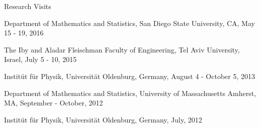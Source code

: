 \documentclass[10pt]{article} %
\newenvironment{innerlist}[1][\enskip\textbullet]%
        {\begin{compactitem}[#1]}{\end{compactitem}}
\begin{document}
\begin{section}{Research Visits}
\begin{innerlist}
\item Department of Mathematics and Statistics, San Diego State University, CA, May 15 - 19, 2016
\item The Iby and Aladar Fleischman Faculty of Engineering, Tel Aviv University, Israel, July 5 - 10, 2015
\item Instit\"ut f\"ur Physik, Universit\"at Oldenburg, Germany, August 4 - October 5, 2013
\item Department of Mathematics and Statistics, University of Massachusetts Amherst, MA, September - October, 2012
\item Instit\"ut f\"ur Physik, Universit\"at Oldenburg, Germany, July, 2012
\end{innerlist} 

\end{section}
\end{document}
